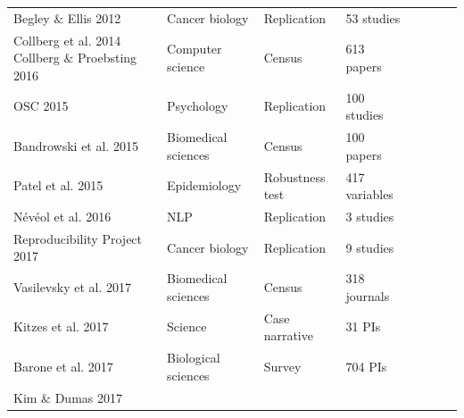 \documentclass{drexelthesis}
\begin{document}
\begin{table}[H]
\begin{adjustbox}{max width=\textwidth}
\begin{tabular}{p{3.86cm}p{4.12cm}p{4.29cm}p{4.24cm}p{3.86cm}p{4.12cm}p{4.29cm}p{4.24cm}}
\multicolumn{1}{p{3.86cm}}{Begley $\&$ Ellis 2012 \cite{Begley2012-mt}} & 
\multicolumn{1}{p{4.12cm}}{Cancer biology} & 
\multicolumn{1}{p{4.29cm}}{Replication} & 
\multicolumn{1}{p{4.24cm}}{53 studies} \\ 
\multicolumn{1}{p{3.86cm}}{Collberg et al. 2014 \cite{Collberg2014-cj} \newline
Collberg $\&$ Proebsting 2016 \cite{Collberg2016-we}} & 
\multicolumn{1}{p{4.12cm}}{Computer science} & 
\multicolumn{1}{p{4.29cm}}{Census} & 
\multicolumn{1}{p{4.24cm}}{613 papers} \\ 
\multicolumn{1}{p{3.86cm}}{OSC 2015 \cite{Open_Science_Collaboration2015-rm}} & 
\multicolumn{1}{p{4.12cm}}{Psychology} & 
\multicolumn{1}{p{4.29cm}}{Replication} & 
\multicolumn{1}{p{4.24cm}}{100 studies} \\ 
\multicolumn{1}{p{3.86cm}}{Bandrowski et al. 2015 \cite{Bandrowski2015-qu}} & 
\multicolumn{1}{p{4.12cm}}{Biomedical sciences} & 
\multicolumn{1}{p{4.29cm}}{Census} & 
\multicolumn{1}{p{4.24cm}}{100 papers} \\ 
\multicolumn{1}{p{3.86cm}}{Patel et al. 2015 \cite{Patel2015-zu}} & 
\multicolumn{1}{p{4.12cm}}{Epidemiology} & 
\multicolumn{1}{p{4.29cm}}{Robustness test} & 
\multicolumn{1}{p{4.24cm}}{417 variables} \\ 
\multicolumn{1}{p{3.86cm}}{Névéol et al. 2016 \cite{Neveol2016-ou}} & 
\multicolumn{1}{p{4.12cm}}{NLP} & 
\multicolumn{1}{p{4.29cm}}{Replication} & 
\multicolumn{1}{p{4.24cm}}{3 studies} \\ 
\multicolumn{1}{p{3.86cm}}{Reproducibility Project 2017 \cite{Nosek2017-jk}} & 
\multicolumn{1}{p{4.12cm}}{Cancer biology} & 
\multicolumn{1}{p{4.29cm}}{Replication} & 
\multicolumn{1}{p{4.24cm}}{9 studies} \\ 
\multicolumn{1}{p{3.86cm}}{Vasilevsky et al. 2017 \cite{Vasilevsky2017-vd}} & 
\multicolumn{1}{p{4.12cm}}{Biomedical sciences} & 
\multicolumn{1}{p{4.29cm}}{Census} & 
\multicolumn{1}{p{4.24cm}}{318 journals} \\ 
\multicolumn{1}{p{3.86cm}}{Kitzes et al. 2017 \cite{Kitzes2017-qx}} & 
\multicolumn{1}{p{4.12cm}}{Science} & 
\multicolumn{1}{p{4.29cm}}{Case narrative} & 
\multicolumn{1}{p{4.24cm}}{31 PIs} \\ 
\multicolumn{1}{p{3.86cm}}{Barone et al. 2017 \cite{Barone2017-ac}} & 
\multicolumn{1}{p{4.12cm}}{Biological sciences} & 
\multicolumn{1}{p{4.29cm}}{Survey} & 
\multicolumn{1}{p{4.24cm}}{704 PIs} \\ 
\multicolumn{1}{p{3.86cm}}{Kim $\&$ Dumas 2017 \cite{Kim2017-rz}} & 

\end{tabular}
\end{adjustbox}
\end{table}
\end{document}
